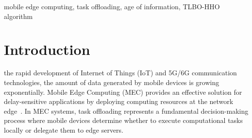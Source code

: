 \documentclass[conference]{IEEEtran}
\begin{document}
\begin{abstract}
\textbf{Mobile Edge Computing (MEC) emerges as a paradigm shift in distributed computing, bringing computational resources closer to end-users to support latency-sensitive and computation-intensive applications in 5G/6G networks. However, task offloading in MEC environments faces critical challenges: the inherent tradeoff between energy consumption and processing latency, the dynamic nature of wireless channels affecting transmission reliability, and the increasing demand for real-time information freshness in IoT applications. This paper proposes a two-phase integrated Teaching-Learning-Based Optimization and Harris Hawks Optimization (TLBO-HHO) algorithm to address this comprehensive optimization problem. We establish an optimization model incorporating Age of Information (AoI) as a key metric for information freshness, prove its NP-hardness, and develop an adaptive switching mechanism that balances global exploration and local exploitation. According to the simulation results, TLBO-HHO achieves fitness value improvements of 54.5\%, 63.5\%, and 76.2\% compared to three other existing mechanisms, while maintaining an average AoI of 1.68s through intelligent resource allocation strategies.}
\end{abstract}

\begin{IEEEkeywords}
mobile edge computing, task offloading, age of information, TLBO-HHO algorithm
\end{IEEEkeywords}

\section{Introduction}
 the rapid development of Internet of Things (IoT) and 5G/6G communication technologies, the amount of data generated by mobile devices is growing exponentially. Mobile Edge Computing (MEC) provides an effective solution for delay-sensitive applications by deploying computing resources at the network edge~\cite{mao2017survey}. In MEC systems, task offloading represents a fundamental decision-making process where mobile devices determine whether to execute computational tasks locally or delegate them to edge servers. 
\end{document}
